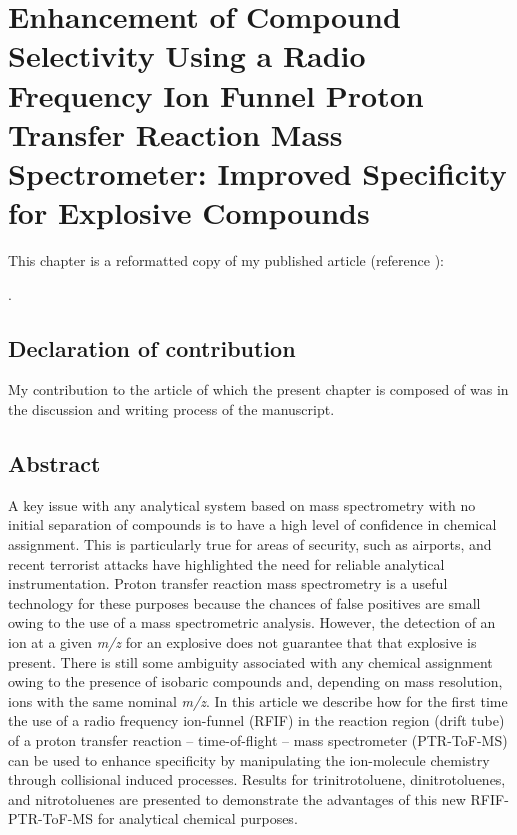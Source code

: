 \chapter{Enhancement of Compound Selectivity Using a Radio Frequency Ion Funnel Proton Transfer Reaction Mass Spectrometer: Improved
Specificity for Explosive Compounds}


This chapter is a reformatted copy of my published article (reference \cite{RF_TNT}):

.








\section*{Declaration of contribution}
My contribution to the article of which the present chapter is composed of was
in the discussion and writing process of the manuscript. 

\section{Abstract}
A key issue with any analytical system based on mass spectrometry with no initial separation of compounds is to have a high level of confidence in chemical assignment. This is particularly true for areas of security, such as airports, and recent terrorist attacks have highlighted the need for reliable analytical instrumentation. Proton transfer reaction mass spectrometry is a useful technology for these purposes because the chances of false positives are small owing to the use of a mass spectrometric analysis. However, the detection of an ion at a given \textit{m/z} for an explosive does not guarantee that that explosive is present. There is still some ambiguity associated with any chemical assignment owing to the presence of isobaric compounds and, depending on mass resolution, ions with the same nominal \textit{m/z}. In this article we describe how for the first time the use of a radio frequency ion-funnel (RFIF) in the reaction region (drift tube) of a proton transfer reaction -- time-of-flight -- mass spectrometer (PTR-ToF-MS) can be used to enhance specificity by manipulating the ion-molecule chemistry through collisional induced processes. Results for trinitrotoluene, dinitrotoluenes, and nitrotoluenes are presented to demonstrate the advantages of this new RFIF-PTR-ToF-MS for analytical chemical purposes.

